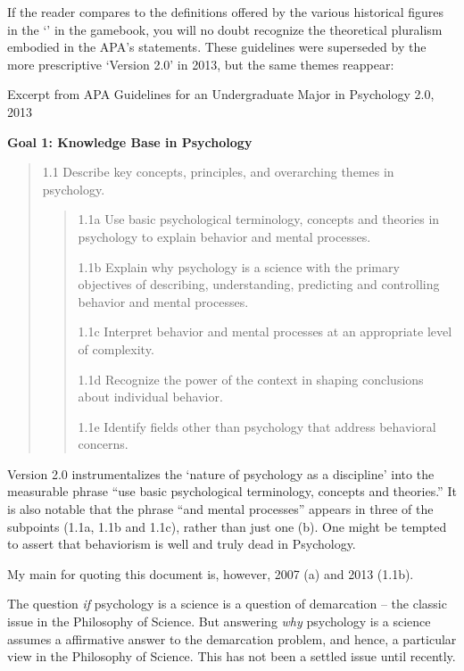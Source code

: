 \begin{refsection}
If the reader compares to the definitions offered by the various historical figures in the ‘’ in the gamebook, you will no doubt recognize the theoretical pluralism embodied in the APA's statements. These guidelines were superseded by the more prescriptive ‘Version 2.0’ in 2013, but the same themes reappear:

\begin{apatextbox}{Excerpt from APA Guidelines for an Undergraduate Major in Psychology 2.0, 2013}

\textbf{Goal 1: Knowledge Base in Psychology}

\begin{quote}

1.1 Describe key concepts, principles, and overarching themes in psychology.

\begin{quote}

1.1a Use basic psychological terminology, concepts and theories in psychology to explain behavior and mental processes.

1.1b Explain why psychology is a science with the primary objectives of describing, understanding, predicting and controlling behavior and mental processes.

1.1c Interpret behavior and mental processes at an appropriate level of complexity.

1.1d Recognize the power of the context in shaping conclusions about individual behavior.

1.1e Identify fields other than psychology that address behavioral concerns.
\end{quote}
\end{quote}

\label{excerptfromapaguidelinesforanundergraduatemajorinpsychology2.02013}
\end{apatextbox}

Version 2.0 instrumentalizes the ‘nature of psychology as a discipline’ into the measurable phrase ``use basic psychological terminology, concepts and theories.'' It is also notable that the phrase “and mental processes” appears in three of the subpoints (1.1a, 1.1b and 1.1c), rather than just one (b). One might be tempted to assert that behaviorism is well and truly dead in Psychology. 

My main for quoting this document is, however, 2007 (a) and 2013 (1.1b).

The question \emph{if} psychology is a science is a question of demarcation – the classic issue in the Philosophy of Science. But answering \emph{why} psychology is a science assumes a affirmative answer to the demarcation problem, and hence, a particular view in the Philosophy of Science. This has not been a settled issue until recently.


\end{refsection}
